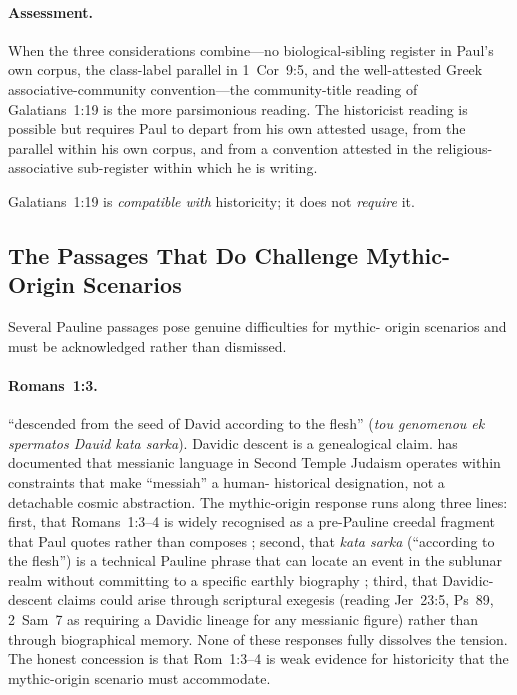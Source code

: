 \documentclass[12pt,oneside]{article}
\newcommand{\grk}[1]{\textit{#1}}
\begin{document}
\paragraph{Assessment.}
When the three considerations combine---no biological-sibling
register in Paul's own corpus, the class-label parallel in
1~Cor~9:5, and the well-attested Greek associative-community
convention---the community-title reading of Galatians~1:19 is the
more parsimonious reading.  The historicist reading is possible
but requires Paul to depart from his own attested usage, from the
parallel within his own corpus, and from a convention attested in
the religious-associative sub-register within which he is writing.

Galatians~1:19 is \textit{compatible with} historicity; it does
not \textit{require} it.

\subsection{The Passages That Do Challenge Mythic-Origin Scenarios}

Several Pauline passages pose genuine difficulties for mythic-
origin scenarios and must be acknowledged rather than dismissed.

\paragraph{Romans~1:3.}
\enquote{descended from the seed of David according to the flesh}
(\grk{tou genomenou ek spermatos Dauid kata sarka}).  Davidic
descent is a genealogical claim.  \citet{Novenson2012,Novenson2017}
has documented that messianic language in Second Temple Judaism
operates within constraints that make \enquote{messiah} a human-
historical designation, not a detachable cosmic abstraction.  The
mythic-origin response runs along three lines: first, that
Romans~1:3--4 is widely recognised as a pre-Pauline creedal
fragment that Paul quotes rather than composes \citep{Jewett2007};
second, that \grk{kata sarka} (\enquote{according to the flesh})
is a technical Pauline phrase that can locate an event in the
sublunar realm without committing to a specific earthly biography
\citep{Carrier2014}; third, that Davidic-descent claims could arise
through scriptural exegesis (reading Jer~23:5, Ps~89, 2~Sam~7 as
requiring a Davidic lineage for any messianic figure) rather than
through biographical memory.  None of these responses fully
dissolves the tension.  The honest concession is that Rom~1:3--4
is weak evidence for historicity that the mythic-origin scenario
must accommodate.
\end{document}
